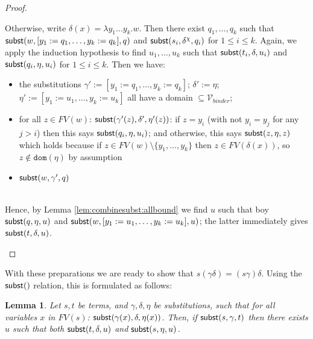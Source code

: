 \documentclass{lmcs}
\theoremstyle{theorem}\newtheorem{theorem}{Theorem}
\theoremstyle{theorem}\newtheorem{lemma}[theorem]{Lemma}
\theoremstyle{theorem}\newtheorem{corollary}[theorem]{Corollary}
\theoremstyle{definition}\newtheorem{definition}[theorem]{Definition}
\theoremstyle{definition}\newtheorem{example}[theorem]{Example}
\newcommand{\Vbound}{\mathcal{V}_{\mathit{binder}}}
\newcommand{\FV}{\mathit{FV}}
\newcommand{\domain}{\mathtt{dom}}
\newcommand{\avar}{x}
\newcommand{\bvar}{y}
\newcommand{\cvar}{z}
\newcommand{\abs}[2]{\lambda #1.#2}
\begin{document}
\begin{proof}
{\begin{itemize}
      Otherwise, write $\delta(\avar) = \abs{\bvar_1 \dots \bvar_k}{w}$.
      Then there exist $q_1,\dots,q_k$ such that $\subrel{w, [\bvar_1:=q_1,\dots,\bvar_k:=q_k],q}$
      and $\mathsf{subst}(s_i,\delta^\chi,q_i)$ for $1 \leq i \leq k$.
      Again, we apply the induction hypothesis to find $u_1,\dots,u_k$ such that
      $\mathsf{subst}(t_i,\delta,u_i)$ and $\mathsf{subst}(q_i,\eta,u_i)$ for $1 \leq i \leq k$.
      Then we have:
      \begin{itemize}
      \item the substitutions $\gamma' := [\bvar_1:=q_1,\dots,\bvar_k:=q_k]$;
        $\delta' := \eta$;
        $\eta' := [\bvar_1:=u_1,\dots,\bvar_k:=u_k]$
        all have a domain $\subseteq \Vbound$;
      \item for all $\cvar \in \FV(w)$: $\subrel{\gamma'(\cvar),\delta',\eta'(\cvar)}$:
        if $\cvar = \bvar_i$ (with not $\bvar_i = \bvar_j$ for any $j > i$) then
        this says $\mathsf{subst}(q_i,\eta,u_i)$; and otherwise, this says $\subrel{\cvar,\eta,
        \cvar}$ which holds because if $\cvar \in \FV(w) \setminus \{\bvar_1,\dots,
        \bvar_k\}$ then $\cvar \in \FV(\delta(\avar))$, so $\cvar \notin \domain(\eta)$ by
        assumption
      \item $\mathsf{subst}(w,\gamma',q)$
      \end{itemize}
      \ \\
      Hence, by Lemma \ref{lem:combinesubst:allbound} we find $u$ such that boy
      $\mathsf{subst}(q,\eta,u)$ and $\subrel{w,[\bvar_1:=u_1,\dots,\bvar_k:=u_k],u}$; the latter
      immediately gives $\mathsf{subst}(t,\delta,u)$.
      \qedhere
    \end{itemize}
}
\end{proof}

With these preparations we are ready to show that $s(\gamma\delta) = (s\gamma)\delta$.
Using the $\mathsf{subst}()$ relation, this is formulated as follows:

\begin{lemma}\label{lem:combinesubst:main}
Let $s,t$ be terms, and $\gamma,\delta,\eta$ be substitutions, such that for all variables $x$ in
$\FV(s)$: $\mathsf{subst}(\gamma(x),\delta,\eta(x))$.  Then,
  if $\mathsf{subst}(s,\gamma,t)$ then there exists $u$ such that both $\mathsf{subst}(t,\delta,u)$ and
  $\mathsf{subst}(s,\eta,u)$.
\end{lemma}
\end{document}
